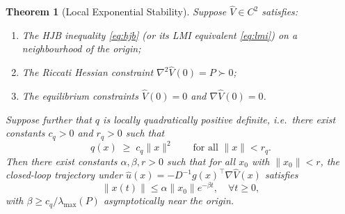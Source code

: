 \documentclass[11pt]{article}
\newtheorem{theorem}{Theorem}[section]
\begin{document}
\begin{theorem}[Local Exponential Stability]
\label{thm:stability}
Suppose $\hat{V}\in C^2$ satisfies:
\begin{enumerate}
\item The HJB inequality \eqref{eq:hjb} (or its LMI equivalent \eqref{eq:lmi}) on a neighbourhood of the origin;
\item The Riccati Hessian constraint $\nabla^2 \hat{V}(0) = P \succ 0$;
\item The equilibrium constraints $\hat{V}(0) = 0$ and $\nabla \hat{V}(0) = 0$.
\end{enumerate}
Suppose further that $q$ is \emph{locally quadratically positive definite}, i.e.\ there exist constants $c_q > 0$ and $r_q > 0$ such that
\begin{equation}
q(x) \;\geq\; c_q \|x\|^2 \qquad \text{for all } \|x\| < r_q.
\label{eq:local_q_pd}
\end{equation}
Then there exist constants $\alpha, \beta, r > 0$ such that for all $x_0$ with $\|x_0\| < r$, the closed-loop trajectory under $\hat{u}(x) = -D^{-1}g(x)^\top \nabla \hat{V}(x)$ satisfies
\begin{equation}
\|x(t)\| \leq \alpha \|x_0\| e^{-\beta t}, \quad \forall t \geq 0,
\label{eq:exp_stability}
\end{equation}
with $\beta \geq c_q / \lambda_{\max}(P)$ asymptotically near the origin.
\end{theorem}
\end{document}
